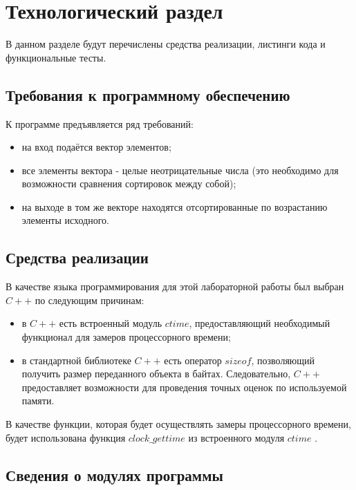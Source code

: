 \chapter{Технологический раздел}

В данном разделе будут перечислены средства реализации, листинги кода и функциональные тесты.

\section{Требования к программному обеспечению}

К программе предъявляется ряд требований:

\begin{itemize} [label=--]
	\item на вход подаётся вектор элементов;
	\item все элементы вектора - целые неотрицательные числа (это необходимо для возможности сравнения сортировок между собой);
	\item на выходе в том же векторе находятся отсортированные по возрастанию элементы исходного.
\end{itemize}

\section{Средства реализации}

В качестве языка программирования для этой лабораторной работы был выбран $C++$ \cite{pl} по следующим причинам:

\begin{itemize}[label=--]
	\item в $C++$ есть встроенный модуль $ctime$, предоставляющий необходимый функционал для замеров процессорного времени;
	\item в стандартной библиотеке $C++$ есть оператор $sizeof$, позволяющий получить размер переданного объекта в байтах. Следовательно, $C++$ предоставляет возможности для проведения точных оценок по используемой памяти.
\end{itemize}

В качестве функции, которая будет осуществлять замеры процессорного времени, будет использована функция $clock\_gettime$ из встроенного модуля $ctime$ \cite{cpu_time_func}.

\section{Сведения о модулях программы}

